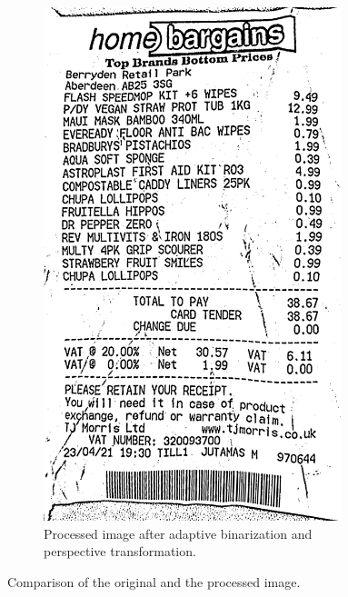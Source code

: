 \documentclass[
  printed, %
  table,   %
  oneside, %
  lof,     %
  lot,     %
]{fithesis3}
\newcommand\half{0.45}
\newcommand\subfigsize{0.95}
\begin{document}
\begin{figure}[H]
\begin{subfigure}[t]{\half\textwidth}
          \includegraphics[width=\subfigsize\textwidth]{figures/image_processing/processed_image}
          \caption{Processed image after adaptive binarization and perspective transformation.}
        \end{subfigure}
        \caption{Comparison of the original and the processed image.}
        \label{fig:original_vs_processed}
    \end{figure}
\end{document}
